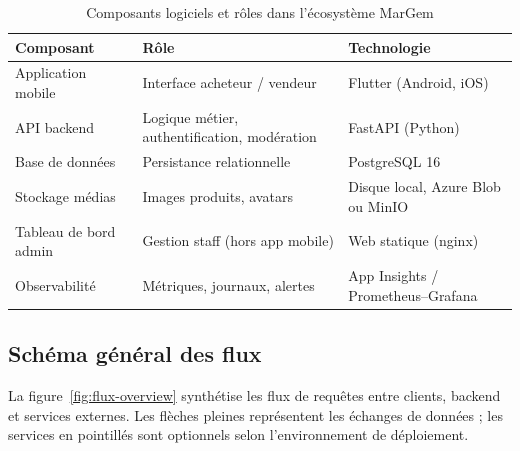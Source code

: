 \begin{table}[H]
  \centering
  \caption{Composants logiciels et rôles dans l'écosystème MarGem}
  \label{tab:composants-margem}
  \begin{tabularx}{\textwidth}{@{}lXl@{}}
    \toprule
    \textbf{Composant} & \textbf{Rôle} & \textbf{Technologie} \\
    \midrule
    Application mobile & Interface acheteur / vendeur & Flutter (Android, iOS) \\
    API backend & Logique métier, authentification, modération & FastAPI (Python) \\
    Base de données & Persistance relationnelle & PostgreSQL 16 \\
    Stockage médias & Images produits, avatars & Disque local, Azure Blob ou MinIO \\
    Tableau de bord admin & Gestion staff (hors app mobile) & Web statique (nginx) \\
    Observabilité & Métriques, journaux, alertes & App Insights / Prometheus--Grafana \\
  \bottomrule
  \end{tabularx}
\end{table}

\subsection{Schéma général des flux}

La figure~\ref{fig:flux-overview} synthétise les flux de requêtes entre clients, backend et services externes. Les flèches pleines représentent les échanges de données ; les services en pointillés sont optionnels selon l'environnement de déploiement.

